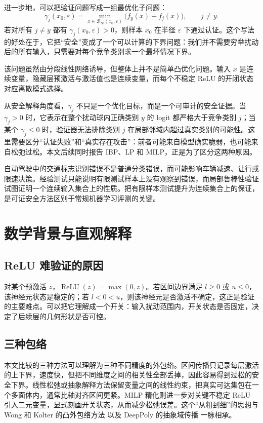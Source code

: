 \documentclass[11pt,a4paper]{ctexart}
\newcommand{\B}{\mathcal{B}}
\newcommand{\relu}{\operatorname{ReLU}}
\begin{document}
进一步地，可以把验证问题写成一组最优化子问题：
\[
\gamma_j(x_0,\varepsilon)=\min_{x\in\B_\infty(x_0,\varepsilon)} \bigl(f_y(x)-f_j(x)\bigr),\qquad j\neq y.
\]
若对所有 $j\neq y$ 都有 $\gamma_j(x_0,\varepsilon)>0$，则样本 $x_0$ 在半径 $\varepsilon$ 下通过认证。这个写法的好处在于，它把“安全”变成了一个可以计算的下界问题：我们并不需要穷举扰动后的所有输入，只需要对每个竞争类别求一个最坏情况下界。

该问题虽然由分段线性网络诱导，但整体上并不是简单凸优化问题。输入 $x$ 是连续变量，隐藏层预激活与激活值也是连续变量，而每个不稳定 ReLU 的开闭状态对应离散模式选择。

从安全解释角度看，$\gamma_j$ 不只是一个优化目标，而是一个可审计的安全证据。当 $\gamma_j>0$ 时，它表示在整个扰动球内正确类别 $y$ 的 logit 都严格大于竞争类别 $j$；当某个 $\gamma_j\le 0$ 时，验证器无法排除类别 $j$ 在局部邻域内超过真实类别的可能性。这里需要区分“认证失败”和“真实存在攻击”：前者可能来自模型确实脆弱，也可能来自松弛过松。本文后续同时报告 IBP、LP 和 MILP，正是为了区分这两种原因。

自动驾驶中的交通标志识别错误不是普通分类错误，而可能影响车辆减速、让行或限速决策。经验测试只能说明有限测试样本上没有观察到错误，而局部鲁棒性验证试图证明一个连续输入集合上的性质。把有限样本测试提升为连续集合上的保证，是可证安全方法区别于常规机器学习评测的关键。

\section{数学背景与直观解释}
\subsection{ ReLU 难验证的原因}
对某个预激活 $z$，$\relu(z)=\max(0,z)$。若区间边界满足 $l\ge 0$ 或 $u\le 0$，该神经元状态是稳定的；若 $l<0<u$，则该神经元是否激活不确定，这正是验证的主要难点。可以把它理解成一个开关：输入扰动范围内，开关状态是否固定，决定了后续层的几何形状是否可控。

\subsection{三种包络}
本文比较的三种方法可以理解为三种不同精度的外包络。区间传播只记录每层激活的上下界，速度快，但把不同维度之间的相关性全部丢掉，因此容易得到过松的安全下界。线性松弛或抽象解释方法保留变量之间的线性约束，把真实可达集包在一个多面体内，通常比轴对齐区间更紧。MILP 精化则进一步对关键不稳定 ReLU 引入二元变量，显式刻画开关状态，从而减少松弛误差。这个“从粗到细”的思想与 Wong 和 Kolter 的凸外包络方法 \cite{wong2018convex} 以及 DeepPoly 的抽象域传播 \cite{singh2019deeppoly} 一脉相承。
\end{document}
